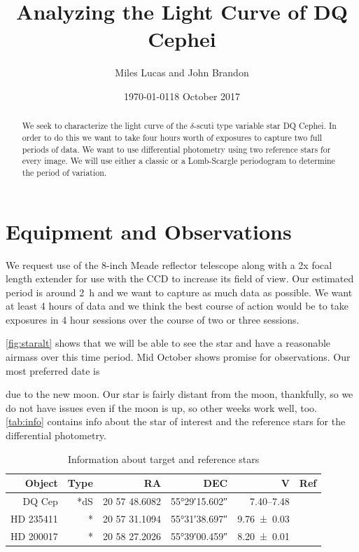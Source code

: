 \documentclass[]{article}
\title{Analyzing the Light Curve of DQ Cephei}
\author{Miles Lucas and John Brandon}
\date{\today}
\begin{document}
\maketitle


\begin{abstract}
	We seek to characterize the light curve of the $\delta$-scuti type variable star DQ Cephei. In order to do this we want to take four hours worth of exposures to capture two full periods of data. We want to use differential photometry using two reference stars for every image. We will use either a classic or a Lomb-Scargle periodogram to determine the period of variation.
\end{abstract}

\section{Equipment and Observations}
	We request use of the 8-inch Meade reflector telescope along with a 2x focal length extender for use with the CCD to increase its field of view. Our estimated period is around \SI{2}{\hour} and we want to capture as much data as possible. We want at least 4 hours of data and we think the best course of action would be to take exposures in 4 hour sessions over the course of two or three sessions. 
	
	\autoref{fig:staralt} shows that we will be able to see the star and have a reasonable airmass over this time period. Mid October shows promise for observations. Our most preferred date is \date{18 October 2017} due to the new moon. Our star is fairly distant from the moon, thankfully, so we do not have issues even if the moon is up, so other weeks work well, too. \autoref{tab:info} contains info about the star of interest and the reference stars for the differential photometry.
	\begin{table}[]
		\centering
		\caption{Information about target and reference stars}
		\begin{tabular}{rrrrrr}
			\hline
			Object & Type &            RA &                DEC &                      V &                        Ref \\ \hline\hline
			DQ Cep &  *dS & 20 57 48.6082 & \ang{55;29;15.602} & \SIrange{7.40}{7.48}{} & \autocite{1971GCVS3.C......0K} \\
			HD 235411 &    * & 20 57 31.1094 & \ang{55;31;38.697} &     \SI{9.76\pm0.03}{} &  \autocite{2000AA...355L..27H} \\
			HD 200017 &    * & 20 58 27.2026 & \ang{55;39;00.459} &     \SI{8.20\pm0.01}{} &  \autocite{2000AA...355L..27H} \\ \hline
		\end{tabular}
		\label{tab:info}
	\end{table}
\end{document}
